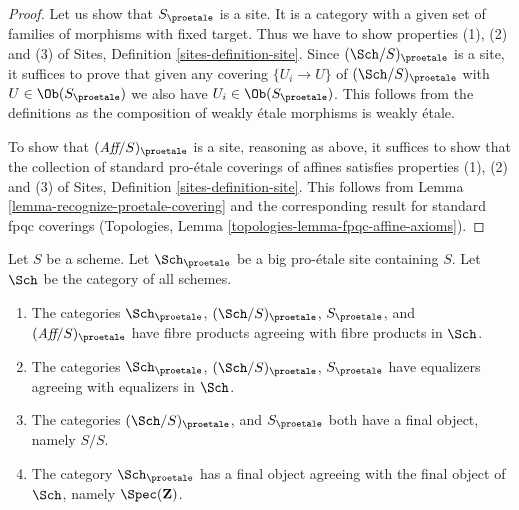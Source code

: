 \begin{proof}
Let us show that $S_\proetale$ is a site. It is a category with a
given set of families of morphisms with fixed target. Thus we
have to show properties (1), (2) and (3) of
Sites, Definition \ref{sites-definition-site}.
Since $(\Sch/S)_\proetale$ is a site, it suffices to prove
that given any covering $\{U_i \to U\}$ of $(\Sch/S)_\proetale$
with $U \in \Ob(S_\proetale)$ we also have $U_i \in \Ob(S_\proetale)$.
This follows from the definitions
as the composition of weakly \'etale morphisms is weakly \'etale.

\medskip\noindent
To show that $(\textit{Aff}/S)_\proetale$ is a site, reasoning as above,
it suffices to show that the collection of standard pro-\'etale coverings
of affines satisfies properties (1), (2) and (3) of
Sites, Definition \ref{sites-definition-site}.
This follows from Lemma \ref{lemma-recognize-proetale-covering}
and the corresponding result for standard fpqc coverings
(Topologies, Lemma \ref{topologies-lemma-fpqc-affine-axioms}).
\end{proof}

\begin{lemma}
\label{lemma-fibre-products-proetale}
Let $S$ be a scheme. Let $\Sch_\proetale$ be a big pro-\'etale
site containing $S$. Let $\Sch$ be the category of all schemes.
\begin{enumerate}
\item The categories $\Sch_\proetale$, $(\Sch/S)_\proetale$,
$S_\proetale$, and $(\textit{Aff}/S)_\proetale$ have fibre products
agreeing with fibre products in $\Sch$.
\item The categories $\Sch_\proetale$, $(\Sch/S)_\proetale$,
$S_\proetale$ have equalizers agreeing with equalizers in $\Sch$.
\item The categories $(\Sch/S)_\proetale$, and $S_\proetale$ both have
a final object, namely $S/S$.
\item The category $\Sch_\proetale$ has a final object agreeing
with the final object of $\Sch$, namely $\Spec(\mathbf{Z})$.
\end{enumerate}
\end{lemma}

